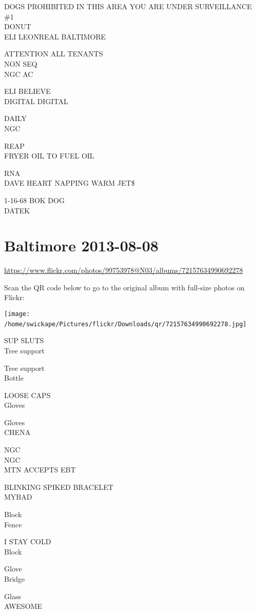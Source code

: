 \documentclass[10pt,letterpaper]{article}
\begin{document}
DOGS PROHIBITED IN THIS AREA YOU ARE UNDER SURVEILLANCE\\
\#1\\
DONUT\\
ELI LEONREAL BALTIMORE

ATTENTION ALL TENANTS\\
NON SEQ\\
NGC AC

ELI BELIEVE\\
DIGITAL DIGITAL

DAILY\\
NGC

REAP\\
FRYER OIL TO FUEL OIL

RNA\\
DAVE HEART NAPPING WARM JET\$

1{-}16{-}68 BOK DOG\\
DATEK
\

\section*{Baltimore 2013-08-08}

\url{https://www.flickr.com/photos/99753978@N03/albums/72157634990692278}

Scan the QR code below to go to the original album with full-size photos on Flickr:

\texttt{[image: /home/swickape/Pictures/flickr/Downloads/qr/72157634990692278.jpg]}
\

SUP SLUTS\\
Tree support

Tree support\\
Bottle

LOOSE CAPS\\
Gloves

Gloves\\
CHENA

NGC\\
NGC\\
MTN ACCEPTS EBT

BLINKING SPIKED BRACELET\\
MYBAD

Block\\
Fence

I STAY COLD\\
Block

Glove\\
Bridge

Glass\\
AWESOME
\end{document}
